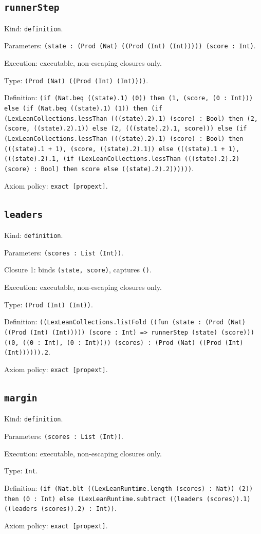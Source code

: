 \documentclass[11pt]{article}
\begin{document}
\subsection*{\texttt{runnerStep}}
\noindent Kind: \texttt{definition}.\par
\noindent Parameters: \texttt{(state : (Prod (Nat) ((Prod (Int) (Int))))) (score : Int)}.\par
\noindent Execution: executable, non-escaping closures only.\par
\noindent Type: \texttt{(Prod (Nat) ((Prod (Int) (Int))))}.\par
\noindent Definition: \texttt{(if (Nat.beq ((state).1) (0)) then (1, (score, (0 : Int))) else (if (Nat.beq ((state).1) (1)) then (if (LexLeanCollections.lessThan (((state).2).1) (score) : Bool) then (2, (score, ((state).2).1)) else (2, (((state).2).1, score))) else (if (LexLeanCollections.lessThan (((state).2).1) (score) : Bool) then (((state).1 + 1), (score, ((state).2).1)) else (((state).1 + 1), (((state).2).1, (if (LexLeanCollections.lessThan (((state).2).2) (score) : Bool) then score else ((state).2).2))))))}.\par
\noindent Axiom policy: \texttt{exact [propext]}.\par
\subsection*{\texttt{leaders}}
\noindent Kind: \texttt{definition}.\par
\noindent Parameters: \texttt{(scores : List (Int))}.\par
\noindent Closure 1: binds \texttt{(state, score)}, captures \texttt{()}.\par
\noindent Execution: executable, non-escaping closures only.\par
\noindent Type: \texttt{(Prod (Int) (Int))}.\par
\noindent Definition: \texttt{((LexLeanCollections.listFold ((fun (state : (Prod (Nat) ((Prod (Int) (Int))))) (score : Int) => runnerStep (state) (score))) ((0, ((0 : Int), (0 : Int)))) (scores) : (Prod (Nat) ((Prod (Int) (Int)))))).2}.\par
\noindent Axiom policy: \texttt{exact [propext]}.\par
\subsection*{\texttt{margin}}
\noindent Kind: \texttt{definition}.\par
\noindent Parameters: \texttt{(scores : List (Int))}.\par
\noindent Execution: executable, non-escaping closures only.\par
\noindent Type: \texttt{Int}.\par
\noindent Definition: \texttt{(if (Nat.blt ((LexLeanRuntime.length (scores) : Nat)) (2)) then (0 : Int) else (LexLeanRuntime.subtract ((leaders (scores)).1) ((leaders (scores)).2) : Int))}.\par
\noindent Axiom policy: \texttt{exact [propext]}.\par
\end{document}
